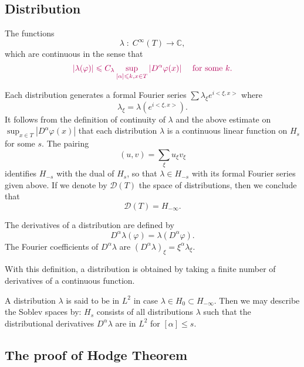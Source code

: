 \documentclass[twoside,openany,12pt]{beautynote}
\newcommand{\tmcolor}[2]{{\color{#1}{#2}}}
\begin{document}
\subsection{ Distribution}

\begin{definition}
  The \tmcolor{red}{linear} functions
  \[ \lambda \; : \; C^{\infty} (T) \longrightarrow \mathbb{C}, \]
  which are {{\color[HTML]{B4005A}continuous}} in the sense that
  \[  {\color[HTML]{B4005A}| \lambda (\varphi) | \leqslant
    C_{\lambda} \sup_{[\alpha] \leqslant k, x \in T} | D^{\alpha} \varphi (x)
    | \quad \text{ for some $k$.}}\]
\end{definition}

Each distribution generates a formal Fourier series $\sum \lambda_{\xi} e^{i <
\xi, x >}$ where
\[ \lambda_{\xi} = \lambda (e^{i < \xi, x >}) . \]
{\color[HTML]{B4005A}It follows from the definition of
continuity of $\lambda$ and the above estimate on $\sup_{x \in T} | D^{\alpha}
\varphi (x) |$ that each distribution $\lambda$ is a continuous linear
function on $H_s$ for some $s$.} The pairing
\[  (u, v) = \sum_{\xi} u_{\xi} v_{\xi} \]
identifies $H_{- s}$ with the dual of $H_s$, so that $\lambda \in H_{- s}$
with its formal Fourier series given above. If we denote by $\mathcal{D} (T)$
the space of distributions, then we conclude that
\[ \mathcal{D} (T) = H_{- \infty} . \]

\begin{definition}
  The derivatives of a distribution are defined by
  \[ D^{\alpha} \lambda (\varphi) = \lambda (D^{\alpha} \varphi) . \]
  The Fourier coefficients of $D^{\alpha} \lambda$ are $(D^{\alpha}
  \lambda)_{\xi} = \xi^{\alpha} \lambda_{\xi}$.
\end{definition}

With this definition, a distribution is obtained by taking a finite
number of derivatives of a continuous function.

{\color[HTML]{B4005A}
  A distribution $\lambda$ is said to be in $L^2$ in case $\lambda \in H_0
  \subset H_{- \infty}$. Then we may describe the Soblev spaces by:
  $H_s$ consists of all distributions $\lambda$ such that the
  distributional derivatives $D^{\alpha} \lambda$ are in $L^2$ for $[\alpha]
  \leqslant s$.}

\subsection{ The proof of Hodge Theorem}
\end{document}
